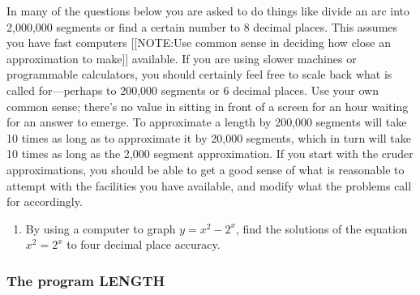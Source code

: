 In many of the questions below you are asked to do things like divide
 an arc into 2,000,000 segments or find a certain number to 8 decimal
 places.  This assumes you have fast computers [[NOTE:Use common sense
 in deciding how close an approximation to make]] available.  If you
 are using slower machines or programmable calculators, you should
 certainly feel free to scale back what is called for---perhaps to
 200,000 segments or 6 decimal places.  Use your own common sense;
 there's no value in sitting in front of a screen for an hour waiting
 for an answer to emerge.  To approximate a length by 200,000 segments
 will take 10 times as long as to approximate it by 20,000 segments,
 which in turn will take 10 times as long as the 2,000 segment
 approximation.  If you start with the cruder approximations, you
 should be able to get a good sense of what is reasonable to attempt
 with the facilities you have available, and modify what the problems
 call for accordingly.  
\begin{enumerate}
\item By using a computer to graph $y = x^2 -
 2^x$, find the solutions of the equation $x^2 = 2^x$ to four decimal
 place accuracy.

\end{enumerate}
\subsubsection{The program LENGTH}
\label{subsubsec:the-program-length}




